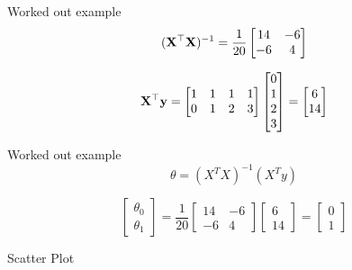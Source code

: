 \documentclass{beamer}
\begin{document}
\begin{frame}{Worked out example}
    $$(\mathbf{X}^\top\mathbf{X})^{-1} = \frac{1}{20} \begin{bmatrix}
                14 & -6\\
                -6& 4
            \end{bmatrix}$$
            
    $$\mathbf{X}^\top\mathbf{y} = \begin{bmatrix}
            1&1&1&1\\
            0&1&2&3
            \end{bmatrix}\begin{bmatrix}
            0\\1\\2\\3
            \end{bmatrix}=\begin{bmatrix}
                6\\
                14
            \end{bmatrix}$$
\end{frame}


\begin{frame}{Worked out example}
    $$\theta = (X^{T}X)^{-1}(X^{T}y)$$
    
    $$\begin{bmatrix}
        \theta_{0}\\
        \theta_{1}
    \end{bmatrix} = \frac{1}{20} \begin{bmatrix}
    14 & -6\\
    -6& 4
    \end{bmatrix}\begin{bmatrix}
    6\\
    14
    \end{bmatrix} =
    \begin{bmatrix}
        0\\
        1
    \end{bmatrix}$$
\end{frame}

\begin{frame}{Scatter Plot}


\end{frame}
\end{document}
